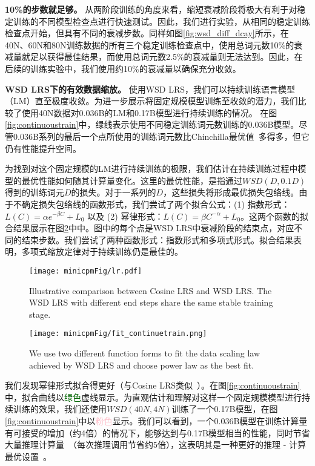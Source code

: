\textbf{10\%的步数就足够。} 从两阶段训练的角度来看，缩短衰减阶段将极大有利于对稳定训练的不同模型检查点进行快速测试。因此，我们进行实验，从相同的稳定训练检查点开始，但具有不同的衰减步数。同样如图\ref{fig:wsd_diff_dcay}所示，在40N、60N和80N训练数据的所有三个稳定训练检查点中，使用总词元数10\%的衰减量就足以获得最佳结果，而使用总词元数2.5\%的衰减量则无法达到。因此，在后续的训练实验中，我们使用约10\%的衰减量以确保充分收敛。

\textbf{WSD LRS下的有效数据缩放。} 使用WSD LRS，我们可以持续训练语言模型（LM）直至极度收敛。为进一步展示将固定规模模型训练至收敛的潜力，我们比较了使用40N数据对0.036B的LM和0.17B模型进行持续训练的情况。
在图\ref{fig:continuoustrain}中，绿线表示使用不同稳定训练词元数训练的0.036B模型。尽管0.036B系列的最后一个点所使用的训练词元数比Chinchilla最优值~\citep{hoffmann2022training}多得多，但它仍有性能提升空间。


为找到对这个固定规模的LM进行持续训练的极限，我们估计在持续训练过程中模型的最优性能如何随其计算量变化。这里的最优性能，是指通过${WSD}(D, 0.1D)$得到的训练词元$D$的损失。对于一系列的$D$，这些损失将形成最优损失包络线。由于不确定损失包络线的函数形式，我们尝试了两个拟合公式：(1) 指数形式：$L(C) = \alpha e^{-\beta C} + L_0$ 以及 (2) 幂律形式：$L(C) = \beta C^{-\alpha} + L_0$。这两个函数的拟合结果展示在图\ref{fig:fit_continue_train}中中。图中的每个点是WSD LRS中衰减阶段的结束点，对应不同的结束步数。我们尝试了两种函数形式：指数形式和多项式形式。拟合结果表明，多项式缩放定律对于持续训练仍是最佳的。 


\begin{figure}[!htbp]
    \centering
        \texttt{[image: minicpmFig/lr.pdf]}
        \caption{Illustrative comparison between Cosine LRS and WSD LRS. The WSD LRS with different end steps share the same stable training stage. }\label{fig:learning_rate_scheduler_diagram}
\end{figure}
\begin{figure}[!htbp]
    \centering
    \texttt{[image: minicpmFig/fit\_continuetrain.png]}
    \caption{We use two different function forms to fit the data scaling law achieved by WSD LRS and choose power law as the best fit.}
    \label{fig:fit_continue_train}
\end{figure}



我们发现幂律形式拟合得更好（与Cosine LRS类似~\citep{kaplan2020scaling}）。在图\ref{fig:continuoustrain}中，拟合曲线以\textcolor{darkgreen}{绿色}虚线显示。为直观估计和理解对这样一个固定规模模型进行持续训练的效果，我们还使用$WSD(40N, 4N)$训练了一个0.17B模型，在图\ref{fig:continuoustrain}中以\textcolor{pink}{粉色}显示。我们可以看到，一个0.036B模型在训练计算量有可接受的增加（约4倍）的情况下，能够达到与0.17B模型相当的性能，同时节省大量推理计算量~\citep{sardana2023beyond}（每次推理调用节省约5倍），这表明其是一种更好的推理 - 计算最优设置~\citep{sardana2023beyond}。 


